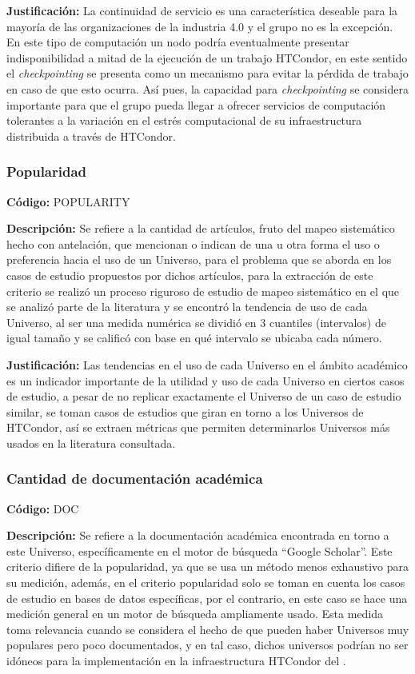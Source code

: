 \textbf{Justificación:} La continuidad de servicio es una característica deseable para la
mayoría de las organizaciones de la industria 4.0 y el grupo \GRID no es la
excepción. En este tipo de computación un nodo podría eventualmente presentar
indisponibilidad a mitad de la ejecución de un trabajo HTCondor, en este sentido el
\textit{checkpointing} se presenta como un mecanismo para evitar la pérdida de trabajo en
caso de que esto ocurra. Así pues, la capacidad para \textit{checkpointing} se considera
importante para que el grupo \GRID pueda llegar a ofrecer servicios de computación
tolerantes a la variación en el estrés computacional de su infraestructura distribuida
a través de HTCondor.



\subsubsection{Popularidad}
\textbf{Código:} POPULARITY

\textbf{Descripción:} Se refiere a la cantidad de artículos, fruto del mapeo sistemático
hecho con antelación, que mencionan o indican de una u otra forma el uso o
preferencia hacia el uso de un Universo, para el problema que se aborda en los
casos de estudio propuestos por dichos artículos, para la extracción de este
criterio se realizó un proceso riguroso de estudio de mapeo sistemático en el que
se analizó parte de la literatura y se encontró la tendencia de uso de cada
Universo, al ser una medida numérica se dividió en 3 cuantiles (intervalos) de igual
tamaño y se calificó con base en qué intervalo se ubicaba cada número.


\textbf{Justificación:} Las tendencias en el uso de cada Universo en el ámbito académico
es un indicador importante de la utilidad y uso de cada Universo en ciertos casos
de estudio, a pesar de no replicar exactamente el Universo de un caso de estudio
similar, se toman casos de estudios que giran en torno a los Universos de
HTCondor, así se extraen métricas que permiten determinarlos Universos más
usados en la literatura consultada.


\subsubsection{Cantidad de documentación académica}
\textbf{Código:} DOC

\textbf{Descripción:} Se refiere a la documentación académica encontrada en torno a
este Universo, específicamente en el motor de búsqueda “Google Scholar”. Este
criterio difiere de la popularidad, ya que se usa un método menos exhaustivo para
su medición, además, en el criterio popularidad solo se toman en cuenta los casos
de estudio en bases de datos específicas, por el contrario, en este caso se hace
una medición general en un motor de búsqueda ampliamente usado. Esta medida
toma relevancia cuando se considera el hecho de que pueden haber Universos
muy populares pero poco documentados, y en tal caso, dichos universos podrían
no ser idóneos para la implementación en la infraestructura HTCondor del \GRID.


